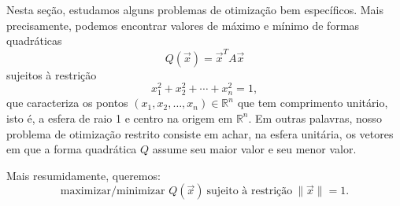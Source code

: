 \documentclass[../livro.tex]{subfiles}
\begin{document}
Nesta seção, estudamos alguns problemas de otimização bem específicos. Mais precisamente, podemos encontrar valores de máximo e mínimo de formas quadráticas
\begin{equation}
Q(\vec{x}) = \vec{x}^T A \vec{x}
\end{equation} sujeitos à restrição 
\begin{equation}
x_1^2 + x_2^2 + \cdots + x_n^2 = 1,
\end{equation} que caracteriza os pontos $(x_1, x_2, \dots, x_n) \in \mathbb{R}^n$ que tem comprimento unitário, isto é, a esfera de raio 1 e centro na origem em $\mathbb{R}^n$. Em outras palavras, nosso problema de otimização restrito consiste em achar, na esfera unitária, os vetores em que a forma quadrática $Q$ assume seu maior valor e seu menor valor.

Mais resumidamente, queremos:
\begin{equation}
\text{maximizar/minimizar } Q(\vec{x}) \ \text{sujeito à restrição} \ \|\vec{x}\|=1.
\end{equation}
\end{document}
